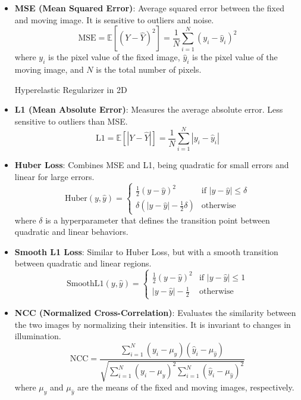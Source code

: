 \begin{itemize}
    \item \textbf{MSE (Mean Squared Error)}:
    Average squared error between the fixed and moving image. It is sensitive to outliers and noise.
    \[
    \text{MSE} = \mathbb{E}[(Y - \hat{Y})^2] = \frac{1}{N} \sum_{i=1}^{N} (y_i - \hat{y}_i)^2
    \]
    where \( y_i \) is the pixel value of the fixed image, \( \hat{y}_i \) is the pixel value of the moving image, and \( N \) is the total number of pixels. \cite{Palubinskas02012017}

    Hyperelastic Regularizer in 2D   \item \textbf{L1 (Mean Absolute Error)}:
    Measures the average absolute error. Less sensitive to outliers than MSE.
    \[
    \text{L1} = \mathbb{E}[|Y - \hat{Y}|] = \frac{1}{N} \sum_{i=1}^{N} |y_i - \hat{y}_i|
    \]

    \item \textbf{Huber Loss}:
    Combines MSE and L1, being quadratic for small errors and linear for large errors.
    \[
    \text{Huber}(y, \hat{y}) = \begin{cases}
    \frac{1}{2}(y - \hat{y})^2 & \text{if } |y - \hat{y}| \leq \delta \\
    \delta(|y - \hat{y}| - \frac{1}{2}\delta) & \text{otherwise}
    \end{cases}
    \]
    where \( \delta \) is a hyperparameter that defines the transition point between quadratic and linear behaviors.

    \item \textbf{Smooth L1 Loss}:
    Similar to Huber Loss, but with a smooth transition between quadratic and linear regions.
    \[
    \text{SmoothL1}(y, \hat{y}) = \begin{cases}
    \frac{1}{2}(y - \hat{y})^2 & \text{if } |y - \hat{y}| \leq 1 \\
    |y - \hat{y}| - \frac{1}{2} & \text{otherwise}
    \end{cases}
    \]

    \item \textbf{NCC (Normalized Cross-Correlation)}:
    Evaluates the similarity between the two images by normalizing their intensities. It is invariant to changes in illumination.
    \[
    \text{NCC} = \frac{\sum_{i=1}^{N} (y_i - \mu_y)(\hat{y}_i - \mu_{\hat{y}})}{\sqrt{\sum_{i=1}^{N} (y_i - \mu_y)^2 \sum_{i=1}^{N} (\hat{y}_i - \mu_{\hat{y}})^2}}
    \]
    where \( \mu_y \) and \( \mu_{\hat{y}} \) are the means of the fixed and moving images, respectively.


\end{itemize}
